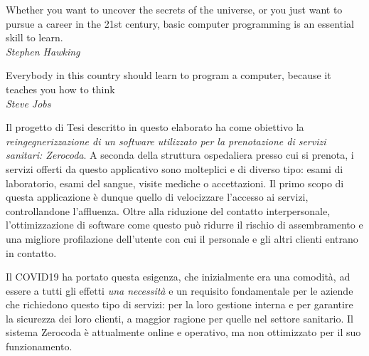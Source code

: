 \documentclass[
    corpo=11pt,
    twoside,
]{toptesi}
\begin{document}

\begin{flushright}
  \noindent
  Whether you want to uncover the secrets of the universe, or you just want to pursue a career in the 21st century, basic computer programming is an essential skill to learn.\\
  \vspace{5px}
  \small{\textit{Stephen Hawking}}
\end{flushright}
\begin{flushright}
  \noindent
  Everybody in this country should learn to program a computer, because it teaches you how to think\\
  \vspace{5px}
  \small{\textit{Steve Jobs}}
\end{flushright}
\cleardoublepage


\ringraziamenti


\sommario %
Il progetto di Tesi descritto in questo elaborato ha come obiettivo la \emph{reingegnerizzazione di un software utilizzato per la prenotazione di servizi sanitari: Zerocoda}. A seconda della struttura ospedaliera presso cui si prenota, i servizi offerti da questo applicativo sono molteplici e di diverso tipo: esami di laboratorio, esami del sangue, visite mediche o accettazioni. Il primo scopo di questa applicazione è dunque quello di velocizzare l'accesso ai servizi, controllandone l'affluenza. Oltre alla riduzione del contatto interpersonale, l'ottimizzazione di software come questo può ridurre il rischio di assembramento e una migliore profilazione dell'utente con cui il personale e gli altri clienti entrano in contatto.

Il COVID19 ha portato questa esigenza, che inizialmente era una comodità, ad essere a tutti gli effetti \textit{una necessità} e un requisito fondamentale per le aziende che richiedono questo tipo di servizi: per la loro gestione interna e per garantire la sicurezza dei loro clienti, a maggior ragione per quelle nel settore sanitario. Il sistema Zerocoda è attualmente online e operativo, ma non ottimizzato per il suo funzionamento.
\end{document}
